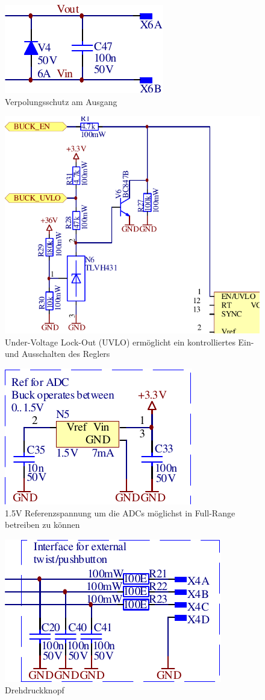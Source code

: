 \begin{figure}[H]
    \center
    \includegraphics[width=.35\textwidth]{images/circuit/output-connectors.pdf}
    \caption{Verpolungsschutz am Ausgang}
    \label{fig:circuit:output}
\end{figure}

\begin{figure}[H]
    \center
    \includegraphics[width=.6\textwidth]{images/circuit/uvlo.pdf}
    \caption{Under-Voltage Lock-Out (UVLO) erm\"oglicht ein kontrolliertes Ein- und Ausschalten des Reglers}
    \label{fig:circuit:uvlo}
\end{figure}

\begin{figure}[H]
    \center
    \includegraphics[width=.4\textwidth]{images/circuit/vref.pdf}
    \caption{1.5V Referenzspannung um die ADCs m\"oglichst in Full-Range betreiben zu k\"onnen}
    \label{fig:circuit:vref}
\end{figure}

\begin{figure}[H]
    \center
    \includegraphics[width=.4\textwidth]{images/circuit/pushbutton.pdf}
    \caption{Drehdruckknopf}
    \label{fig:circuit:pushbutton}
\end{figure}

